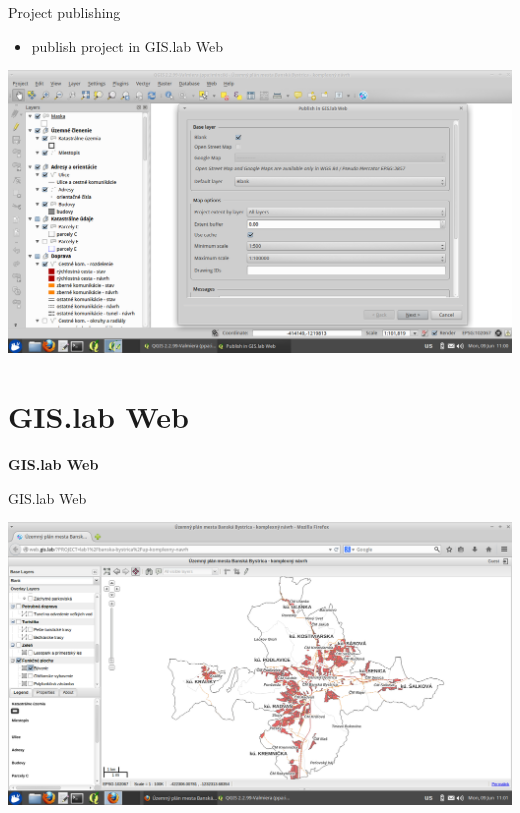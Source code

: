 \documentclass[12pt]{beamer}
\begin{document}
\begin{frame}{Project publishing}
	\begin{itemize}
		\item publish project in GIS.lab Web
	\end{itemize}
	\begin{center}
		\includegraphics[keepaspectratio=true,height=0.6\textheight]{images/real-world-example/project-publish.png}
	\end{center}
\end{frame}


\section{GIS.lab Web}
\begin{frame}
	\begin{center}
		\LARGE\textbf{GIS.lab Web}
	\end{center}
\end{frame}


\begin{frame}{GIS.lab Web}
	\begin{center}
		\includegraphics[keepaspectratio=true,height=0.7\textheight]{images/real-world-example/project-gislab-web.png}
	\end{center}
\end{frame}
\end{document}

